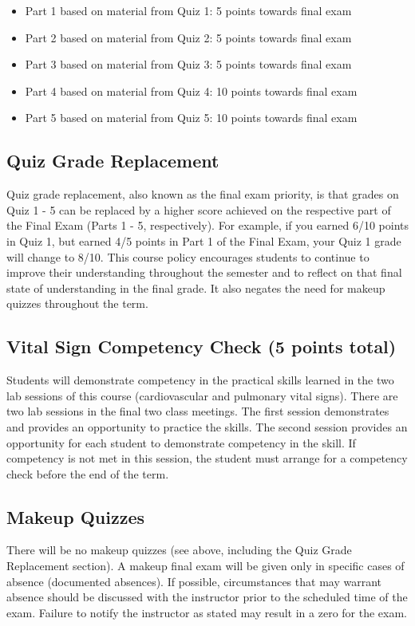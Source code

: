 \documentclass[letterpaper]{inzane_syllabus} %
\begin{document}
\begin{itemize}
\item Part 1 based on material from Quiz 1: 5 points towards final exam
\item Part 2 based on material from Quiz 2: 5 points towards final exam
\item Part 3 based on material from Quiz 3: 5 points towards final exam
\item Part 4 based on material from Quiz 4: 10 points towards final exam
\item Part 5 based on material from Quiz 5: 10 points towards final exam
\end{itemize}

\subsection{Quiz Grade Replacement}

Quiz grade replacement, also known as the final exam priority, is that grades on Quiz 1 - 5 can be replaced by a higher score achieved on the respective part of the Final Exam (Parts 1 - 5, respectively). For example, if you earned 6/10 points in Quiz 1, but earned 4/5 points in Part 1 of the Final Exam, your Quiz 1 grade will change to 8/10. This course policy encourages students to continue to improve their understanding throughout the semester and to reflect on that final state of understanding in the final grade. It also negates the need for makeup quizzes throughout the term.
\bigskip
\subsection{Vital Sign Competency Check (5 points total)}

Students will demonstrate competency in the practical skills learned in the two lab sessions of this course (cardiovascular and pulmonary vital signs). There are two lab sessions in the final two class meetings. The first session demonstrates and provides an opportunity to practice the skills. The second session provides an opportunity for each student to demonstrate competency in the skill. If competency is not met in this session, the student must arrange for a competency check before the end of the term.

\subsection{Makeup Quizzes}

There will be no makeup quizzes (see above, including the Quiz Grade Replacement section). A makeup final exam will be given only in specific cases of absence (documented absences). If possible, circumstances that may warrant absence should be discussed with the instructor prior to the scheduled time of the exam. Failure to notify the instructor as stated may result in a zero for the exam.
\end{document}
